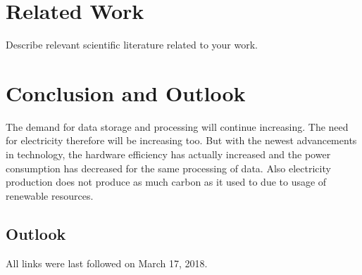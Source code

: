 \documentclass[
  a4paper,  %
  twoside,  %
  bibliography=totoc,
  headsepline,
  cleardoublepage=empty,
  parskip=half,
  draft=false
]{scrbook}
\begin{document}
\blinddocument

\chapter{Related Work}

Describe relevant scientific literature related to your work.

\chapter{Conclusion and Outlook}
\label{chap:zusfas}
The demand for data storage and processing will continue increasing. The need for electricity therefore will be increasing too. But with the newest advancements in technology, the hardware efficiency has actually increased and the power consumption has decreased for the same processing of data. Also 
electricity production does not produce as much carbon as it used to due to usage of renewable resources. 


\section*{Outlook}

\printbibliography

All links were last followed on March 17, 2018.

\appendix


\pagestyle{empty}
\renewcommand*{\chapterpagestyle}{empty}
\Versicherung
\end{document}
